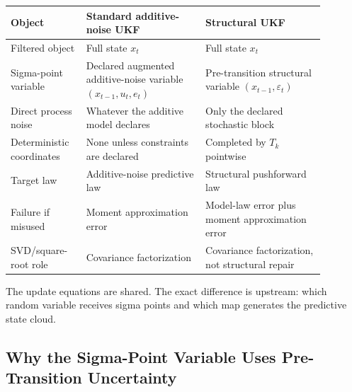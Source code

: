\begin{center}
\begin{tabular}{p{0.20\linewidth}p{0.34\linewidth}p{0.34\linewidth}}
\toprule
\textbf{Object} & \textbf{Standard additive-noise UKF} & \textbf{Structural UKF}\\
\midrule
Filtered object & Full state $x_t$ & Full state $x_t$\\
Sigma-point variable & Declared augmented additive-noise variable
$(x_{t-1},u_t,e_t)$ & Pre-transition structural variable
$(x_{t-1},\varepsilon_t)$\\
Direct process noise & Whatever the additive model declares & Only the declared
stochastic block\\
Deterministic coordinates & None unless constraints are declared & Completed by
$T_k$ pointwise\\
Target law & Additive-noise predictive law & Structural pushforward law\\
Failure if misused & Moment approximation error & Model-law error plus moment
approximation error\\
SVD/square-root role & Covariance factorization & Covariance factorization, not
structural repair\\
\bottomrule
\end{tabular}
\end{center}

The update equations are shared.  The exact difference is upstream: which
random variable receives sigma points and which map generates the predictive
state cloud.

\subsection{Why the Sigma-Point Variable Uses Pre-Transition Uncertainty}
\label{sec:bf-structural-ukf-proposition}

